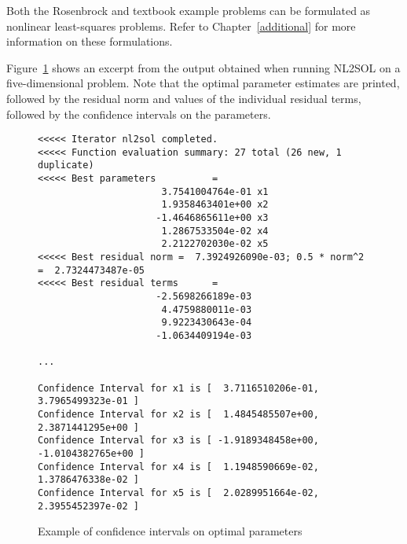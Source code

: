 Both the Rosenbrock and textbook example problems can be formulated as
nonlinear least-squares problems. Refer to Chapter~\ref{additional}
for more information on these formulations.
%

Figure~\ref{nls:figure02} shows an excerpt from the output 
obtained when running NL2SOL on a five-dimensional problem. 
Note that the optimal parameter estimates are printed, 
followed by the residual norm and values of the individual 
residual terms, followed by the confidence intervals on the parameters. 

\begin{figure}
\begin{bigbox}
\begin{small}
\begin{verbatim}
<<<<< Iterator nl2sol completed.
<<<<< Function evaluation summary: 27 total (26 new, 1 duplicate)
<<<<< Best parameters          =
                      3.7541004764e-01 x1
                      1.9358463401e+00 x2
                     -1.4646865611e+00 x3
                      1.2867533504e-02 x4
                      2.2122702030e-02 x5
<<<<< Best residual norm =  7.3924926090e-03; 0.5 * norm^2 =  2.7324473487e-05
<<<<< Best residual terms      =
                     -2.5698266189e-03
                      4.4759880011e-03
                      9.9223430643e-04
                     -1.0634409194e-03

...

Confidence Interval for x1 is [  3.7116510206e-01,  3.7965499323e-01 ]
Confidence Interval for x2 is [  1.4845485507e+00,  2.3871441295e+00 ]
Confidence Interval for x3 is [ -1.9189348458e+00, -1.0104382765e+00 ]
Confidence Interval for x4 is [  1.1948590669e-02,  1.3786476338e-02 ]
Confidence Interval for x5 is [  2.0289951664e-02,  2.3955452397e-02 ]

\end{verbatim}
\end{small}
\end{bigbox}
\caption{Example of confidence intervals on optimal parameters}
\label{nls:figure02}
\end{figure}

